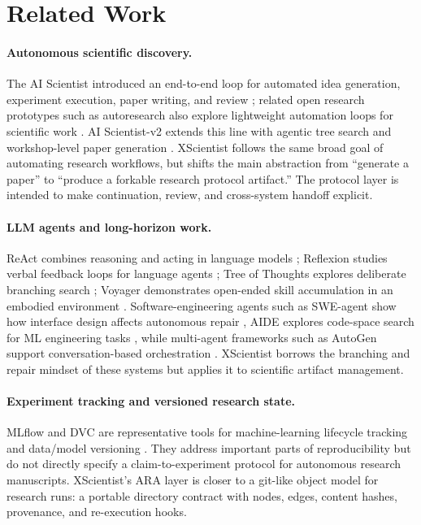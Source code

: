 \documentclass[11pt]{article}
\begin{document}
\section{Related Work}

\paragraph{Autonomous scientific discovery.}
The AI Scientist introduced an end-to-end loop for automated idea generation,
experiment execution, paper writing, and review \cite{ai-scientist}; related
open research prototypes such as autoresearch also explore lightweight
automation loops for scientific work \cite{autoresearch}. AI
Scientist-v2 extends this line with agentic tree search and workshop-level
paper generation \cite{ai-scientist-v2}. XScientist follows the same broad
goal of automating research workflows, but shifts the main abstraction from
``generate a paper'' to ``produce a forkable research protocol artifact.''
The protocol layer is intended to make continuation, review, and
cross-system handoff explicit.

\paragraph{LLM agents and long-horizon work.}
ReAct combines reasoning and acting in language models \cite{react};
Reflexion studies verbal feedback loops for language agents
\cite{reflexion}; Tree of Thoughts explores deliberate branching search
\cite{tree-of-thoughts}; Voyager demonstrates open-ended skill accumulation
in an embodied environment \cite{voyager}. Software-engineering agents such
as SWE-agent show how interface design affects autonomous repair
\cite{swe-agent}, AIDE explores code-space search for ML engineering tasks
\cite{aide}, while multi-agent frameworks such as AutoGen support
conversation-based orchestration \cite{autogen}. XScientist borrows the
branching and repair mindset of these systems but applies it to scientific
artifact management.

\paragraph{Experiment tracking and versioned research state.}
MLflow and DVC are representative tools for machine-learning lifecycle
tracking and data/model versioning \cite{mlflow,dvc}. They address important
parts of reproducibility but do not directly specify a claim-to-experiment
protocol for autonomous research manuscripts. XScientist's ARA layer is
closer to a git-like object model for research runs: a portable directory
contract with nodes, edges, content hashes, provenance, and re-execution
hooks.
\end{document}
